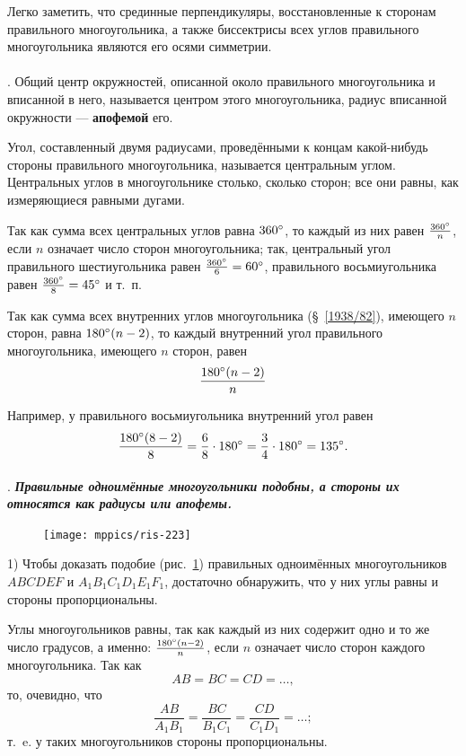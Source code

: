 \documentclass[oneside]{book}
\begin{document}
Легко заметить, что срединные перпендикуляры, восстановленные к сторонам правильного многоугольника, а также биссектрисы всех углов правильного многоугольника являются его осями симметрии.

\paragraph{}\label{1938/217}
.
Общий центр окружностей, описанной около правильного многоугольника и вписанной в него, называется центром этого многоугольника, радиус вписанной окружности — \textbf{апофемой} его.

Угол, составленный двумя радиусами, проведёнными к концам какой-нибудь стороны правильного многоугольника, называется центральным углом.
Центральных углов в многоугольнике столько, сколько сторон;
все они равны, как измеряющиеся равными дугами.

Так как сумма всех центральных углов равна $360\degree$, то каждый из них равен $\tfrac{360\degree}n$, если $n$ означает число сторон многоугольника;
так, центральный угол правильного шестиугольника равен $\tfrac{360\degree}6\z=60\degree$, правильного восьмиугольника равен $\tfrac{360\degree}8 = 45\degree$ и т.~п.

Так как сумма всех внутренних углов многоугольника (§~\ref{1938/82}), имеющего $n$ сторон, равна $180\degree(n-2)$, то каждый внутренний угол правильного многоугольника, имеющего $n$ сторон, равен
\[\frac{180\degree(n-2)}{n}\]

Например, у правильного восьмиугольника внутренний угол равен
\[\frac{180\degree(8-2)}{8}=\frac{6}{8}\cdot 180\degree=\frac{3}{4}\cdot 180\degree=135\degree.\]

\paragraph{}\label{1938/218}
.
\textbf{\emph{Правильные одноимённые многоугольники подобны, а стороны их относятся как радиусы или апофемы.}}

\begin{figure}[h!]
\centering
\texttt{[image: mppics/ris-223]}
\caption{}\label{1938/ris-223}
\end{figure}

1) Чтобы доказать подобие (рис.~\ref{1938/ris-223}) правильных одноимённых многоугольников $ABCDEF$ и $A_1B_1C_1D_1E_1F_1$, достаточно обнаружить, что у них углы равны и стороны пропорциональны.

Углы многоугольников равны, так как каждый из них содержит одно и то же число градусов, а именно: $\frac{180\degree(n-2)}{n}$, если $n$ означает число сторон каждого многоугольника.
Так как \[AB=BC = CD=\dots,\]
то, очевидно, что
\[\frac{AB}{A_1B_1}=\frac{BC}{B_1C_1} = \frac{CD}{C_1D_1}=\dots;\]
т.~e. у таких многоугольников стороны пропорциональны.
\end{document}
